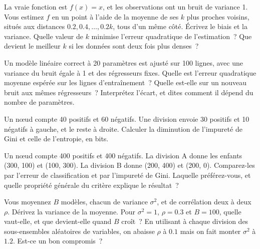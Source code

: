 \begin{question}\label{iq:iv1:machine-learning:10}
La vraie fonction est $f(x) = x$, et les observations ont un bruit de variance 1. Vous estimez $f$ en un point à l'aide de la moyenne de ses $k$ plus proches voisins, situés aux distances $0.2, 0.4, \dots, 0.2k$, tous d'un même côté. Écrivez le biais et la variance. Quelle valeur de $k$ minimise l'erreur quadratique de l'estimation~? Que devient le meilleur $k$ si les données sont deux fois plus denses~?
\end{question}

\begin{question}\label{iq:iv1:machine-learning:11}
Un modèle linéaire correct à 20 paramètres est ajusté sur 100 lignes, avec une variance du bruit égale à 1 et des régresseurs fixes. Quelle est l'erreur quadratique moyenne espérée sur les lignes d'entraînement~? Quelle est-elle sur un nouveau bruit aux mêmes régresseurs~? Interprétez l'écart, et dites comment il dépend du nombre de paramètres.
\end{question}

\begin{question}\label{iq:iv1:machine-learning:12}
Un nœud compte 40 positifs et 60 négatifs. Une division envoie 30 positifs et 10 négatifs à gauche, et le reste à droite. Calculer la diminution de l'impureté de Gini et celle de l'entropie, en bits.
\end{question}

\begin{question}\label{iq:iv1:machine-learning:13}
Un nœud compte 400 positifs et 400 négatifs. La division A donne les enfants (300, 100) et (100, 300). La division B donne (200, 400) et (200, 0). Comparez-les par l'erreur de classification et par l'impureté de Gini. Laquelle préférez-vous, et quelle propriété générale du critère explique le résultat~?
\end{question}

\begin{question}\label{iq:iv1:machine-learning:14}
Vous moyennez $B$ modèles, chacun de variance $\sigma^2$, et de corrélation deux à deux $\rho$. Dérivez la variance de la moyenne. Pour $\sigma^2 = 1$, $\rho = 0.3$ et $B = 100$, quelle vaut-elle, et que devient-elle quand $B$ croît~? En utilisant à chaque division des sous-ensembles aléatoires de variables, on abaisse $\rho$ à $0.1$ mais on fait monter $\sigma^2$ à $1.2$. Est-ce un bon compromis~?
\end{question}

